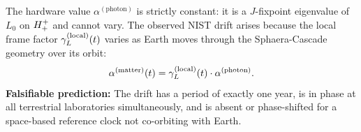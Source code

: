 \begin{corollary}
The hardware value $\alpha^{(\mathrm{photon})}$ is strictly constant:
it is a $J$-fixpoint eigenvalue of $L_0$ on $H^+_+$ and cannot vary.
The observed NIST drift arises because the local frame factor
$\gamma_L^{(\mathrm{local})}(t)$ varies as Earth moves through the
Sphaera-Cascade geometry over its orbit:
\[
  \alpha^{(\mathrm{matter})}(t)
  = \gamma_L^{(\mathrm{local})}(t)\cdot\alpha^{(\mathrm{photon})}.
\]
\textbf{Falsifiable prediction:} The drift has a period of exactly one
year, is in phase at all terrestrial laboratories simultaneously, and is
absent or phase-shifted for a space-based reference clock not co-orbiting
with Earth.
\end{corollary}


